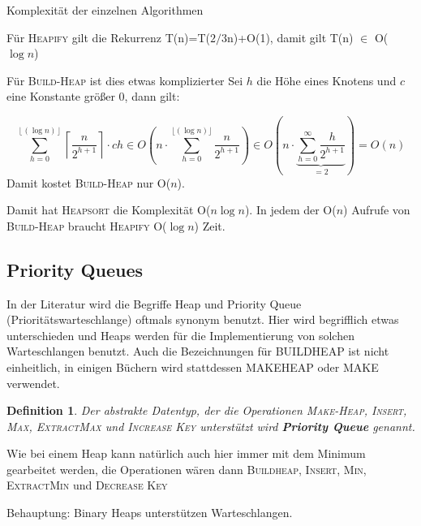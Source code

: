 \documentclass[ngerman,draft,parskip=half*,twoside]{scrreprt}
\theoremstyle{break}
\newtheorem{definition}{Definition}
\begin{document}
Komplexität der einzelnen Algorithmen

Für \textsc{Heapify} gilt die Rekurrenz T(n)=T($2/3$n)+O(1), damit gilt T(n) $\in$ O($\log n$)

Für \textsc{Build-Heap} ist dies etwas komplizierter Sei $h$ die Höhe eines Knotens und $c$ eine Konstante größer 0, dann gilt:
 
\[\sum_{h=0}^{\left\lfloor(\log n)\right\rfloor}\left\lceil\frac{n}{2^{h+1}}\right\rceil \cdot ch \in O\left(n\cdot\sum_{h=0}^{\lfloor(\log
n)\rfloor}
\frac{n}{2^{h+1}}\right) \in O\left(n\cdot\underbrace{\sum_{h=0}^{\infty}
\frac{h}{2^{h+1}}}_{=2}\right)=O(n)\] 
Damit kostet \textsc{Build-Heap} nur O($n$).

Damit hat \textsc{Heapsort} die Komplexität O($n \log n$). In jedem der O($n$) Aufrufe von \textsc{Build-Heap}  braucht
\textsc{Heapify} O($\log n$) Zeit.
%
\subsection{Priority Queues}
In der Literatur wird die Begriffe Heap und Priority Queue (Prioritätswarteschlange) oftmals synonym benutzt. Hier wird begrifflich
etwas unterschieden und Heaps werden für die Implementierung von solchen Warteschlangen benutzt. Auch die Bezeichnungen für
\textsc{BUILDHEAP} ist nicht einheitlich, in einigen Büchern wird stattdessen \textsc{MAKEHEAP} oder \textsc{MAKE} verwendet.

\begin{definition}
Der abstrakte Datentyp, der die Operationen \textsc{Make-Heap, Insert, Max, ExtractMax} und \textsc{Increase Key} unterstützt wird
\textbf{Priority
Queue} genannt.
\end{definition}

Wie bei einem Heap kann natürlich auch hier immer mit dem Minimum gearbeitet werden, die Operationen wären dann \textsc{Buildheap,
Insert, Min, ExtractMin} und \textsc{Decrease Key}

Behauptung: Binary Heaps unterstützen Warteschlangen.
\end{document}
